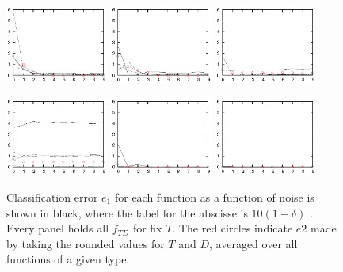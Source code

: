 \documentclass[useAMS,usenatbib]{templates/mn2e}
\begin{document}
\begin{figure}
  \begin{center}
   \includegraphics[width=0.3\textwidth]{fig/err/ea1.eps}
   \includegraphics[width=0.3\textwidth]{fig/err/ea2.eps}
   \includegraphics[width=0.3\textwidth]{fig/err/ea3.eps}
  \end{center}
  \begin{center}
   \includegraphics[width=0.3\textwidth]{fig/err/ea4.eps}
   \includegraphics[width=0.3\textwidth]{fig/err/ea5.eps}
   \includegraphics[width=0.3\textwidth]{fig/err/ea6.eps}
  \end{center}
  \caption{\label{fig:e12a}Classification error $e_1$ for each
    function as a function of noise is shown in black, where the label
    for the abscisse is $10(1-\delta)$ . Every panel holds all
    $f_{TD}$ for fix $T$. The red circles indicate $e2$ made by taking
    the rounded values for $T$ and $D$, averaged over all functions of
    a given type.}
\end{figure}
\end{document}
